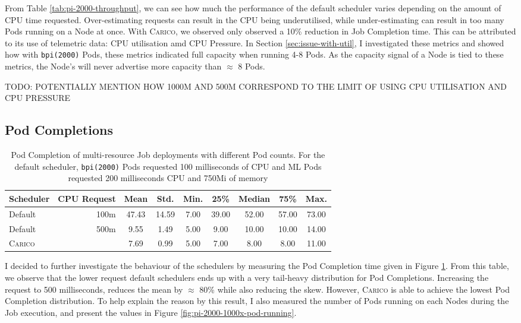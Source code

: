 From Table \ref{tab:pi-2000-throughput}, we can see how much the performance of
the default scheduler varies depending on the amount of CPU time requested.
Over-estimating requests can result in the CPU being underutilised, while
under-estimating can result in too many Pods running on a Node at once. With
\textsc{Carico}, we observed only observed a 10\% reduction in Job Completion time. This
can be attributed to its use of telemetric data: CPU utilisation amd CPU
Pressure. In Section \ref{sec:issue-with-util}, I investigated these metrics and
showed how with \texttt{bpi(2000)} Pods, these metrics indicated full capacity
when running 4-8 Pods. As the capacity signal of a Node is tied to these
metrics, the Node's will never advertise more capacity than $\approx$ 8 Pods.

TODO: POTENTIALLY MENTION HOW 1000M AND 500M CORRESPOND TO THE LIMIT OF USING
CPU UTILISATION AND CPU PRESSURE

\subsection{Pod Completions}
\begin{table}[ht!]
\centering
    \begin{tabular}{|l|r|c|c|c|c|c|c|c|}
    \hline
        \bfseries Scheduler & \bfseries CPU Request & \bfseries Mean & \bfseries Std. &
        \bfseries Min. & \bfseries 25\% & \bfseries Median & \bfseries 75\% & \bfseries Max. \\
    \hline
        Default & 100m & 47.43 & 14.59 & 7.00 & 39.00 & 52.00 & 57.00 & 73.00
        \\
        Default & 500m & 9.55 & 1.49 & 5.00 & 9.00 & 10.00 & 10.00 & 14.00
        \\
        \textsc{Carico} & & 7.69 & 0.99 & 5.00 & 7.00 & 8.00 & 8.00 & 11.00 \\
    \hline
    \end{tabular}
    \caption{Pod Completion of multi-resource Job deployments with different Pod
    counts. For the default scheduler, \texttt{bpi(2000)} Pods requested 100
    milliseconds of CPU and ML Pods requested 200 milliseconds CPU and 750Mi of
    memory}
    \label{tab:cpu-pod-completions}
\end{table}
I decided to further investigate the behaviour of the schedulers by measuring
the Pod Completion time given in Figure \ref{tab:cpu-pod-completions}. From this
table, we observe that the lower request default schedulers ends up with a very
tail-heavy distribution for Pod Completions. Increasing the request to 500
milliseconds, reduces the mean by $\approx$ 80\% while also reducing the skew.
However, \textsc{Carico} is able to achieve the lowest Pod Completion distribution. To
help explain the reason by this result, I also measured the number of Pods
running on each Nodes during the Job execution, and present the values in Figure
\ref{fig:pi-2000-1000x-pod-running}.

